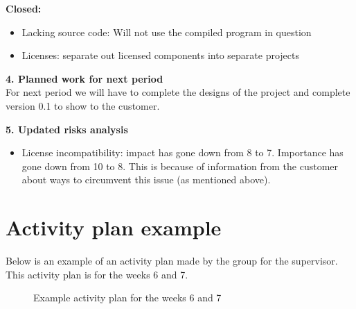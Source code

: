 \textbf{Closed:}
\begin{itemize}
	\item{Lacking source code: Will not use the compiled program in question}
	\item{Licenses: separate out licensed components into separate projects}
\end{itemize}
\vspace{8mm}

\textbf{4. Planned work for next period}\\
For next period we will have to complete the designs of the project and complete version 0.1 to show to the customer.\\
\newline

\textbf{5. Updated risks analysis}\\
\begin{itemize}
	\item{License incompatibility: impact has gone down from 8 to 7. Importance has gone down from 10 to 8. This is because of information from the customer about ways to circumvent this issue (as mentioned above).}
\end{itemize}

\section{Activity plan example}
Below is an example of an activity plan made by the group for the supervisor. This activity plan is for the weeks 6 and 7.\\

\begin{figure}[H]
\caption{Example activity plan for the weeks 6 and 7}
\end{figure}
